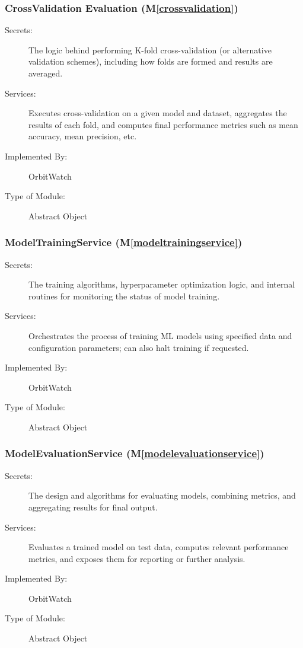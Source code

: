 \documentclass[12pt, titlepage]{article}
\newcommand{\mref}[1]{M\ref{#1}}
\begin{document}
\subsubsection{CrossValidation Evaluation (\mref{crossvalidation})}
\begin{description}
  \item[Secrets:] 
    The logic behind performing K-fold cross-validation (or alternative validation
    schemes), including how folds are formed and results are averaged.
  \item[Services:] 
    Executes cross-validation on a given model and dataset, aggregates the results
    of each fold, and computes final performance metrics such as mean accuracy,
    mean precision, etc.
  \item[Implemented By:] 
    OrbitWatch
  \item[Type of Module:] 
    Abstract Object
\end{description}

\subsubsection{ModelTrainingService (\mref{modeltrainingservice})}
\begin{description}
  \item[Secrets:] 
    The training algorithms, hyperparameter optimization logic, and internal 
    routines for monitoring the status of model training.
  \item[Services:] 
    Orchestrates the process of training ML models using specified data and 
    configuration parameters; can also halt training if requested.
  \item[Implemented By:] 
    OrbitWatch
  \item[Type of Module:] 
    Abstract Object
\end{description}

\subsubsection{ModelEvaluationService (\mref{modelevaluationservice})}
\begin{description}
  \item[Secrets:] 
    The design and algorithms for evaluating models, combining metrics, and 
    aggregating results for final output.
  \item[Services:] 
    Evaluates a trained model on test data, computes relevant performance metrics,
    and exposes them for reporting or further analysis.
  \item[Implemented By:] 
    OrbitWatch
  \item[Type of Module:] 
    Abstract Object

\end{description}
\end{document}
